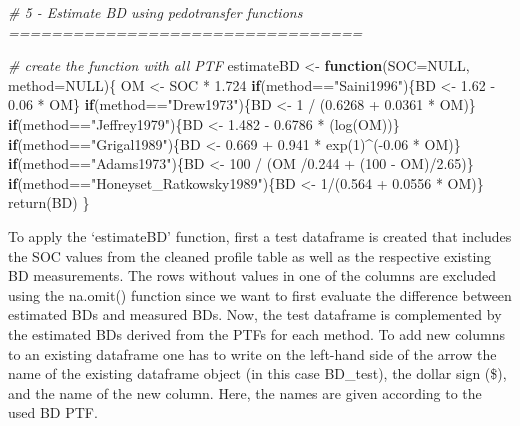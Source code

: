 \documentclass[
  10pt,
  b5paper,
  oneside]{book}
\newenvironment{Shaded}{\begin{snugshade}}{\end{snugshade}}
\newcommand{\AttributeTok}[1]{\textcolor[rgb]{0.77,0.63,0.00}{#1}}
\newcommand{\CommentTok}[1]{\textcolor[rgb]{0.56,0.35,0.01}{\textit{#1}}}
\newcommand{\ConstantTok}[1]{\textcolor[rgb]{0.00,0.00,0.00}{#1}}
\newcommand{\ControlFlowTok}[1]{\textcolor[rgb]{0.13,0.29,0.53}{\textbf{#1}}}
\newcommand{\DecValTok}[1]{\textcolor[rgb]{0.00,0.00,0.81}{#1}}
\newcommand{\FloatTok}[1]{\textcolor[rgb]{0.00,0.00,0.81}{#1}}
\newcommand{\FunctionTok}[1]{\textcolor[rgb]{0.00,0.00,0.00}{#1}}
\newcommand{\NormalTok}[1]{#1}
\newcommand{\OtherTok}[1]{\textcolor[rgb]{0.56,0.35,0.01}{#1}}
\newcommand{\SpecialCharTok}[1]{\textcolor[rgb]{0.00,0.00,0.00}{#1}}
\newcommand{\StringTok}[1]{\textcolor[rgb]{0.31,0.60,0.02}{#1}}
\begin{document}
\begin{Shaded}
\begin{Highlighting}[]
\CommentTok{\# 5 {-} Estimate BD using pedotransfer functions =================================}

\CommentTok{\# create the function with all PTF}
\NormalTok{estimateBD }\OtherTok{\textless{}{-}} \ControlFlowTok{function}\NormalTok{(}\AttributeTok{SOC=}\ConstantTok{NULL}\NormalTok{, }\AttributeTok{method=}\ConstantTok{NULL}\NormalTok{)\{}
\NormalTok{  OM }\OtherTok{\textless{}{-}}\NormalTok{ SOC }\SpecialCharTok{*} \FloatTok{1.724}
  \ControlFlowTok{if}\NormalTok{(method}\SpecialCharTok{==}\StringTok{"Saini1996"}\NormalTok{)\{BD }\OtherTok{\textless{}{-}} \FloatTok{1.62} \SpecialCharTok{{-}} \FloatTok{0.06} \SpecialCharTok{*}\NormalTok{ OM\}}
  \ControlFlowTok{if}\NormalTok{(method}\SpecialCharTok{==}\StringTok{"Drew1973"}\NormalTok{)\{BD }\OtherTok{\textless{}{-}} \DecValTok{1} \SpecialCharTok{/}\NormalTok{ (}\FloatTok{0.6268} \SpecialCharTok{+} \FloatTok{0.0361} \SpecialCharTok{*}\NormalTok{ OM)\}}
  \ControlFlowTok{if}\NormalTok{(method}\SpecialCharTok{==}\StringTok{"Jeffrey1979"}\NormalTok{)\{BD }\OtherTok{\textless{}{-}} \FloatTok{1.482} \SpecialCharTok{{-}} \FloatTok{0.6786} \SpecialCharTok{*}\NormalTok{ (}\FunctionTok{log}\NormalTok{(OM))\}}
  \ControlFlowTok{if}\NormalTok{(method}\SpecialCharTok{==}\StringTok{"Grigal1989"}\NormalTok{)\{BD }\OtherTok{\textless{}{-}} \FloatTok{0.669} \SpecialCharTok{+} \FloatTok{0.941} \SpecialCharTok{*} \FunctionTok{exp}\NormalTok{(}\DecValTok{1}\NormalTok{)}\SpecialCharTok{\^{}}\NormalTok{(}\SpecialCharTok{{-}}\FloatTok{0.06} \SpecialCharTok{*}\NormalTok{ OM)\}}
  \ControlFlowTok{if}\NormalTok{(method}\SpecialCharTok{==}\StringTok{"Adams1973"}\NormalTok{)\{BD }\OtherTok{\textless{}{-}} \DecValTok{100} \SpecialCharTok{/}\NormalTok{ (OM }\SpecialCharTok{/}\FloatTok{0.244} \SpecialCharTok{+}\NormalTok{ (}\DecValTok{100} \SpecialCharTok{{-}}\NormalTok{ OM)}\SpecialCharTok{/}\FloatTok{2.65}\NormalTok{)\}}
  \ControlFlowTok{if}\NormalTok{(method}\SpecialCharTok{==}\StringTok{"Honeyset\_Ratkowsky1989"}\NormalTok{)\{BD }\OtherTok{\textless{}{-}} \DecValTok{1}\SpecialCharTok{/}\NormalTok{(}\FloatTok{0.564} \SpecialCharTok{+} \FloatTok{0.0556} \SpecialCharTok{*}\NormalTok{ OM)\}}
  \FunctionTok{return}\NormalTok{(BD)}
\NormalTok{\}}
\end{Highlighting}
\end{Shaded}

To apply the `estimateBD' function, first a test dataframe is created that includes the SOC values from the cleaned profile table as well as the respective existing BD measurements. The rows without values in one of the columns are excluded using the na.omit() function since we want to first evaluate the difference between estimated BDs and measured BDs.
Now, the test dataframe is complemented by the estimated BDs derived from the PTFs for each method. To add new columns to an existing dataframe one has to write on the left-hand side of the arrow the name of the existing dataframe object (in this case BD\_test), the dollar sign (\$), and the name of the new column. Here, the names are given according to the used BD PTF.
\end{document}
